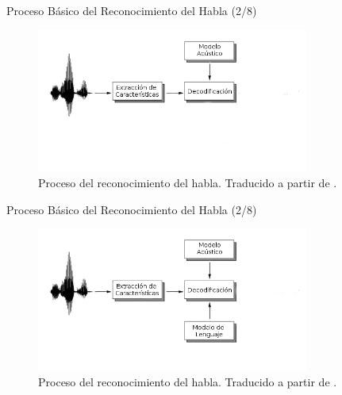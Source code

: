 \begin{frame}{Proceso B\'asico del Reconocimiento del Habla (2/8)}

\begin{figure}[H] 
\centering
\includegraphics[width=0.8\textwidth]{./graphics/proceso_2.png}
\caption{Proceso del reconocimiento del habla. Traducido a partir de \protect\cite{VerenichASR}.}
\label{figure:proceso}
\end{figure}
\end{frame}

\begin{frame}{Proceso B\'asico del Reconocimiento del Habla (2/8)}

\begin{figure}[H] 
\centering
\includegraphics[width=0.8\textwidth]{./graphics/proceso_3.png}
\caption{Proceso del reconocimiento del habla. Traducido a partir de \protect\cite{VerenichASR}.}
\label{figure:proceso}
\end{figure}
\end{frame}

